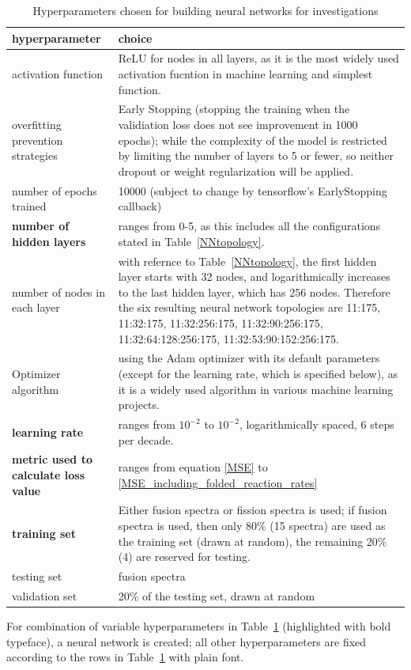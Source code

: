 \documentclass[a4paper, 12pt]{article}
\begin{document}
\begin{table}[H]
\begin{tabularx}{\textwidth}{lX}
hyperparameter & choice  \\
\hline
activation function & ReLU\cite{ReLU} for nodes in all layers, as it is the most widely used activation fucntion in machine learning and simplest function. \\
overfitting prevention strategies & Early Stopping (stopping the training when the validiation loss does not see improvement in 1000 epochs); while the complexity of the model is restricted by limiting the number of layers to 5 or fewer, so neither dropout or weight regularization will be applied. \\
number of epochs trained & 10000 (subject to change by tensorflow's EarlyStopping callback) \\
\textbf{number of hidden layers} & ranges from 0-5, as this includes all the configurations stated in Table~\ref{NNtopology}. \\
number of nodes in each layer & with refernce to Table~\ref{NNtopology}, the first hidden layer starts with 32 nodes, and logarithmically increases to the last hidden layer, which has 256 nodes. Therefore the six resulting neural network topologies are 11:175, 11:32:175, 11:32:256:175, 11:32:90:256:175, 11:32:64:128:256:175, 11:32:53:90:152:256:175.\\
Optimizer algorithm & using the Adam optimizer\cite{AdamOptimizer} with its default parameters (except for the learning rate, which is specified below), as it is a widely used algorithm in various machine learning projects.\\
\textbf{learning rate} & ranges from $10^{-2}$ to $10^{-2}$, logarithmically spaced, 6 steps per decade.\\
\textbf{metric used to calculate loss value} & ranges from equation \ref{MSE} to \ref{MSE_including_folded_reaction_rates}\\
\textbf{training set} & Either fusion spectra or fission spectra is used; if fusion spectra is used, then only 80\% (15 spectra) are used as the training set (drawn at random), the remaining 20\%(4) are reserved for testing. \\
testing set & fusion spectra\\
validation set & 20\% of the testing set, drawn at random
\end{tabularx}
\caption{Hyperparameters chosen for building neural networks for investigations}\label{HyperparameterRange}
\end{table}
For combination of variable hyperparameters in Table~\ref{HyperparameterRange} (highlighted with bold typeface), a neural network is created; all other hyperparameters are fixed according to the rows in Table~\ref{HyperparameterRange} with plain font.
\end{document}
